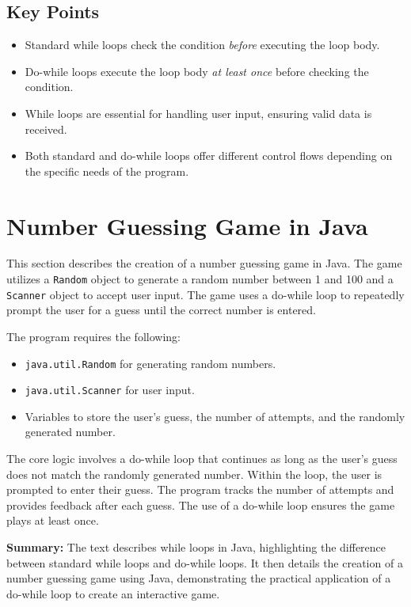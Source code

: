 \documentclass{article}
\begin{document}
\subsection{Key Points}

\begin{itemize}
    \item Standard while loops check the condition \textit{before} executing the loop body.
    \item Do-while loops execute the loop body \textit{at least once} before checking the condition.
    \item While loops are essential for handling user input, ensuring valid data is received.
    \item Both standard and do-while loops offer different control flows depending on the specific needs of the program.
\end{itemize}


\section{Number Guessing Game in Java}

This section describes the creation of a number guessing game in Java.  The game utilizes a \texttt{Random} object to generate a random number between 1 and 100 and a \texttt{Scanner} object to accept user input.  The game uses a do-while loop to repeatedly prompt the user for a guess until the correct number is entered.

The program requires the following:

\begin{itemize}
    \item \texttt{java.util.Random} for generating random numbers.
    \item \texttt{java.util.Scanner} for user input.
    \item Variables to store the user's guess, the number of attempts, and the randomly generated number.
\end{itemize}

The core logic involves a do-while loop that continues as long as the user's guess does not match the randomly generated number.  Within the loop, the user is prompted to enter their guess.  The program tracks the number of attempts and provides feedback after each guess.  The use of a do-while loop ensures the game plays at least once.



\textbf{Summary:} The text describes while loops in Java, highlighting the difference between standard while loops and do-while loops.  It then details the creation of a number guessing game using Java, demonstrating the practical application of a do-while loop to create an interactive game.
\end{document}
